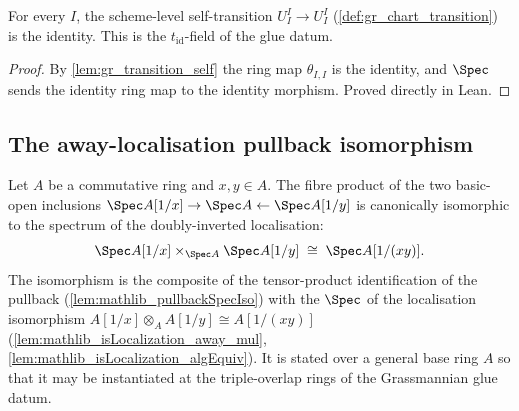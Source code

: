 \begin{lemma}\leanok
  \label{lem:gr_chartTransition_self}
  For every \(I\), the scheme-level self-transition
  \(U^I_I \to U^I_I\) (\cref{def:gr_chart_transition}) is the identity. This is
  the \(t_{\mathrm{id}}\)-field of the glue datum.
\end{lemma}
\begin{proof}
  \leanok
  By \cref{lem:gr_transition_self} the ring map \(\theta_{I,I}\) is the identity,
  and \(\Spec\) sends the identity ring map to the identity morphism. Proved
  directly in Lean.
\end{proof}

\subsection*{The away-localisation pullback isomorphism}

\begin{definition}\leanok
  \label{def:gr_away_pullback_iso}
  Let \(A\) be a commutative ring and \(x, y \in A\). The fibre product of the two
  basic-open inclusions \(\Spec A[1/x] \to \Spec A \leftarrow \Spec A[1/y]\) is
  canonically isomorphic to the spectrum of the doubly-inverted localisation:
  \[
    \Spec A[1/x] \times_{\Spec A} \Spec A[1/y]
      \;\cong\; \Spec A[1/(xy)].
  \]
  The isomorphism is the composite of the tensor-product identification of the
  pullback (\cref{lem:mathlib_pullbackSpecIso}) with the \(\Spec\) of the
  localisation isomorphism
  \(A[1/x] \otimes_A A[1/y] \cong A[1/(xy)]\)
  (\cref{lem:mathlib_isLocalization_away_mul},
  \cref{lem:mathlib_isLocalization_algEquiv}). It is stated over a general base
  ring \(A\) so that it may be instantiated at the triple-overlap rings of the
  Grassmannian glue datum.
\end{definition}

